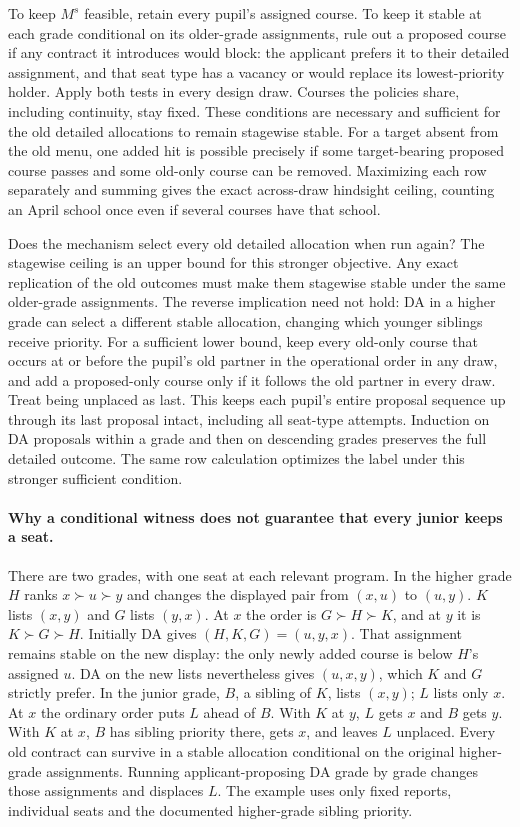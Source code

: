 To keep $M^s$ feasible, retain every pupil's assigned course. To keep it stable at each grade conditional on its older-grade assignments, rule out a proposed course if any contract it introduces would block: the applicant prefers it to their detailed assignment, and that seat type has a vacancy or would replace its lowest-priority holder. Apply both tests in every design draw. Courses the policies share, including continuity, stay fixed. These conditions are necessary and sufficient for the old detailed allocations to remain stagewise stable. For a target absent from the old menu, one added hit is possible precisely if some target-bearing proposed course passes and some old-only course can be removed. Maximizing each row separately and summing gives the exact across-draw hindsight ceiling, counting an April school once even if several courses have that school.

Does the mechanism select every old detailed allocation when run again? The stagewise ceiling is an upper bound for this stronger objective. Any exact replication of the old outcomes must make them stagewise stable under the same older-grade assignments. The reverse implication need not hold: DA in a higher grade can select a different stable allocation, changing which younger siblings receive priority. For a sufficient lower bound, keep every old-only course that occurs at or before the pupil's old partner in the operational order in any draw, and add a proposed-only course only if it follows the old partner in every draw. Treat being unplaced as last. This keeps each pupil's entire proposal sequence up through its last proposal intact, including all seat-type attempts. Induction on DA proposals within a grade and then on descending grades preserves the full detailed outcome. The same row calculation optimizes the label under this stronger sufficient condition.
\paragraph{Why a conditional witness does not guarantee that every junior keeps a seat.}
There are two grades, with one seat at each relevant program. In the higher grade $H$ ranks $x\succ u\succ y$ and changes the displayed pair from $(x,u)$ to $(u,y)$. $K$ lists $(x,y)$ and $G$ lists $(y,x)$. At $x$ the order is $G\succ H\succ K$, and at $y$ it is $K\succ G\succ H$. Initially DA gives $(H,K,G)=(u,y,x)$. That assignment remains stable on the new display: the only newly added course is below $H$'s assigned $u$. DA on the new lists nevertheless gives $(u,x,y)$, which $K$ and $G$ strictly prefer. In the junior grade, $B$, a sibling of $K$, lists $(x,y)$; $L$ lists only $x$. At $x$ the ordinary order puts $L$ ahead of $B$. With $K$ at $y$, $L$ gets $x$ and $B$ gets $y$. With $K$ at $x$, $B$ has sibling priority there, gets $x$, and leaves $L$ unplaced. Every old contract can survive in a stable allocation conditional on the original higher-grade assignments. Running applicant-proposing DA grade by grade changes those assignments and displaces $L$. The example uses only fixed reports, individual seats and the documented higher-grade sibling priority.

